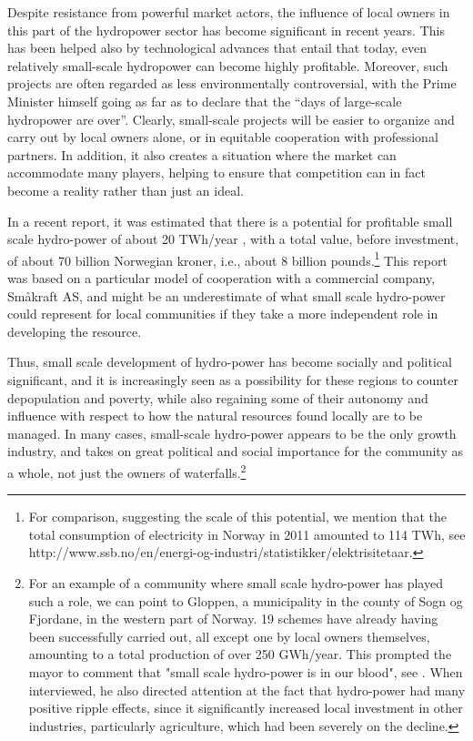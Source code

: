 Despite resistance from powerful market actors, the influence of local owners in this part of the hydropower sector has become significant in recent years. This has been helped also by technological advances that entail that today, even relatively  small-scale hydropower can become highly profitable. Moreover, such projects are often regarded as less environmentally controversial, with the Prime Minister himself going as far as to declare that the ``days of large-scale hydropower are over''.  Clearly, small-scale projects will be easier to organize and carry out by local owners alone, or in equitable cooperation with professional partners. In addition, it   also creates a situation where the market can accommodate many players, helping to ensure that competition can in fact become a reality rather than just an ideal.

In a recent report, it was estimated that there is a potential for profitable small scale hydro-power of about 20 TWh/year \cite{Aanesland}, with a total value, before investment, of about 70 billion Norwegian kroner, i.e., about 8 billion pounds.\footnote{For comparison, suggesting the scale of this potential, we mention that the total consumption of electricity in Norway in 2011 amounted to 114 TWh, see http://www.ssb.no/en/energi-og-industri/statistikker/elektrisitetaar.}  This report was based on a particular model of cooperation with a commercial company, Småkraft AS, and might be an underestimate of what small scale hydro-power could represent for local communities if they take a more independent role in developing the resource. 

Thus, small scale development of hydro-power has become socially and political significant, and it is increasingly seen as a possibility for these regions to counter depopulation and poverty, while also regaining some of their autonomy and influence with respect to how the natural resources found locally are to be managed. In many cases, small-scale hydro-power appears to be the only growth industry, and takes on great political and social importance for the community as a whole, not just the owners of waterfalls.\footnote{For an example of a community where small scale hydro-power has played such a role, we can point to Gloppen, a municipality in the county of Sogn og Fjordane, in the western part of Norway. 19 schemes have already having been successfully carried out, all except one by local owners themselves, amounting to a total production of over 250 GWh/year. This prompted the mayor to comment that "small scale hydro-power is in our blood", see \cite{Gloppen}. When interviewed, he also directed attention at the fact that hydro-power had many positive ripple effects, since it significantly increased local investment in other industries, particularly agriculture, which had been severely on the decline.}

